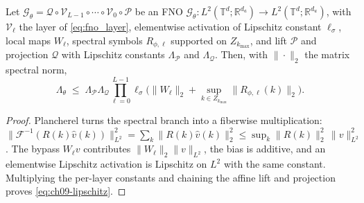 \begin{proposition}
\label{prop:ch09-lip}
Let $\mathcal{G}_\theta=\mathcal{Q}\circ\mathcal{V}_{L-1}\circ\cdots\circ\mathcal{V}_0\circ\mathcal{P}$
be an FNO $\mathcal{G}_\theta : L^2(\mathbb{T}^d;\mathbb{R}^{d_a}) \to
L^2(\mathbb{T}^d;\mathbb{R}^{d_u})$, with $\mathcal{V}_\ell$ the
layer of \eqref{eq:fno_layer}, elementwise activation of
Lipschitz constant $\ell_\sigma$, local maps $W_\ell$, spectral symbols
$R_{\phi,\ell}$ supported on $Z_{k_{\max}}$, and lift $\mathcal{P}$ and
projection $\mathcal{Q}$ with
Lipschitz constants $\Lambda_{\mathcal{P}}$ and $\Lambda_{\mathcal{Q}}$. Then, with
$\|\cdot\|_2$ the matrix spectral norm,
\begin{equation}
  \Lambda_\theta
  \;\le\;
  \Lambda_{\mathcal{P}}\Lambda_{\mathcal{Q}}
  \prod_{\ell=0}^{L-1}\ell_\sigma\Big(\|W_\ell\|_2+\sup_{k\in Z_{k_{\max}}}\|R_{\phi,\ell}(k)\|_2\Big).
  \label{eq:ch09-lipschitz}
\end{equation}
\end{proposition}
\begin{proof}
Plancherel turns the spectral branch into a fiberwise multiplication:
$\|\mathcal{F}^{-1}(R(k)\widehat{v}(k))\|_{L^2}^2=\sum_k\|R(k)\widehat{v}(k)\|_2^2
\le \sup_k\|R(k)\|_2^2\,\|v\|_{L^2}^2$. The bypass $W_\ell v$ contributes
$\|W_\ell\|_2\|v\|_{L^2}$, the bias is additive, and an elementwise Lipschitz
activation is Lipschitz on $L^2$ with the same constant. Multiplying the
per-layer constants and chaining the affine lift and projection proves
\eqref{eq:ch09-lipschitz}.
\end{proof}

